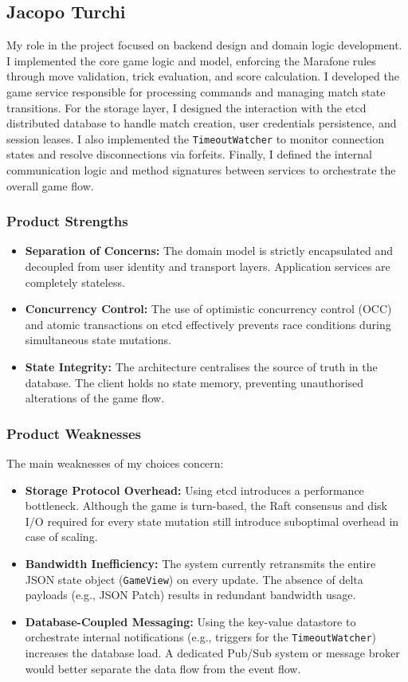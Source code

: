 \documentclass{scrartcl}
\begin{document}
\subsection*{Jacopo Turchi}
My role in the project focused on backend design and domain logic development. I implemented the core game logic and model, enforcing the Marafone rules through move validation, trick evaluation, and score calculation. I developed the game service responsible for processing commands and managing match state transitions. For the storage layer, I designed the interaction with the etcd distributed database to handle match creation, user credentials persistence, and session leases. I also implemented the \texttt{TimeoutWatcher} to monitor connection states and resolve disconnections via forfeits. Finally, I defined the internal communication logic and method signatures between services to orchestrate the overall game flow.

\subsubsection*{Product Strengths}
\begin{itemize}
    \item \textbf{Separation of Concerns:} The domain model is strictly encapsulated and decoupled from user identity and transport layers. Application services are completely stateless.
    \item \textbf{Concurrency Control:} The use of optimistic concurrency control (OCC) and atomic transactions on etcd effectively prevents race conditions during simultaneous state mutations.
    \item \textbf{State Integrity:} The architecture centralises the source of truth in the database. The client holds no state memory, preventing unauthorised alterations of the game flow.
\end{itemize}

\subsubsection*{Product Weaknesses}
The main weaknesses of my choices concern:
\begin{itemize}
    \item \textbf{Storage Protocol Overhead:} Using etcd introduces a performance bottleneck. Although the game is turn-based, the Raft consensus and disk I/O required for every state mutation still introduce suboptimal overhead in case of scaling.
    \item \textbf{Bandwidth Inefficiency:} The system currently retransmits the entire JSON state object (\texttt{GameView}) on every update. The absence of delta payloads (e.g., JSON Patch) results in redundant bandwidth usage.
    \item \textbf{Database-Coupled Messaging:} Using the key-value datastore to orchestrate internal notifications (e.g., triggers for the \texttt{TimeoutWatcher}) increases the database load. A dedicated Pub/Sub system or message broker would better separate the data flow from the event flow.
\end{itemize}
\end{document}
